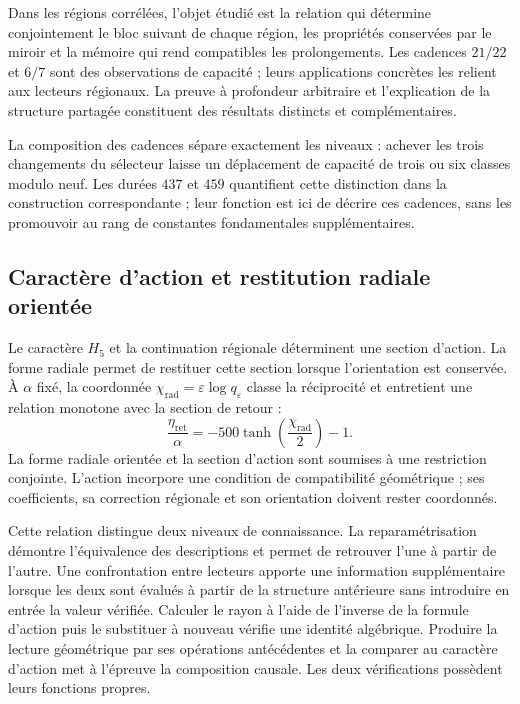 Dans les régions corrélées, l'objet étudié est la relation qui détermine conjointement le bloc suivant de chaque région, les propriétés conservées par le miroir et la mémoire qui rend compatibles les prolongements. Les cadences $21/22$ et $6/7$ sont des observations de capacité ; leurs applications concrètes les relient aux lecteurs régionaux. La preuve à profondeur arbitraire et l'explication de la structure partagée constituent des résultats distincts et complémentaires.

La composition des cadences sépare exactement les niveaux : achever les trois changements du sélecteur laisse un déplacement de capacité de trois ou six classes modulo neuf. Les durées $437$ et $459$ quantifient cette distinction dans la construction correspondante ; leur fonction est ici de décrire ces cadences, sans les promouvoir au rang de constantes fondamentales supplémentaires.

\subsection{Caractère d'action et restitution radiale orientée}
\label{md:lectin:h5}

Le caractère $H_5$ et la continuation régionale déterminent une section d'action. La forme radiale permet de restituer cette section lorsque l'orientation est conservée. À $\alpha$ fixé, la coordonnée $\chi_{\mathrm{rad}}=\varepsilon\log q_\varepsilon$ classe la réciprocité et entretient une relation monotone avec la section de retour :
\begin{equation}
 \frac{\eta_{\mathrm{ret}}}{\alpha}
 =-500\tanh\!\left(\frac{\chi_{\mathrm{rad}}}{2}\right)-1.
 \label{md:lectin:accion-radial}
\end{equation}
La forme radiale orientée et la section d'action sont soumises à une restriction conjointe. L'action incorpore une condition de compatibilité géométrique ; ses coefficients, sa correction régionale et son orientation doivent rester coordonnés.

Cette relation distingue deux niveaux de connaissance. La reparamétrisation démontre l'équivalence des descriptions et permet de retrouver l'une à partir de l'autre. Une confrontation entre lecteurs apporte une information supplémentaire lorsque les deux sont évalués à partir de la structure antérieure sans introduire en entrée la valeur vérifiée. Calculer le rayon à l'aide de l'inverse de la formule d'action puis le substituer à nouveau vérifie une identité algébrique. Produire la lecture géométrique par ses opérations antécédentes et la comparer au caractère d'action met à l'épreuve la composition causale. Les deux vérifications possèdent leurs fonctions propres.

